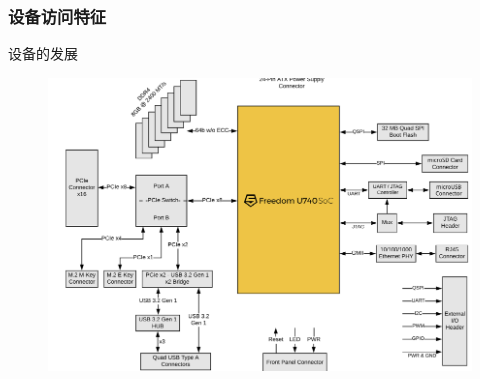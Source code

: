 \begin{frame}[fragile]
    \frametitle{设备访问特征}
    设备的发展
    \begin{figure}
        \includegraphics[width=1.\linewidth]{figs/u740-arch.png}
    \end{figure}
\end{frame}
